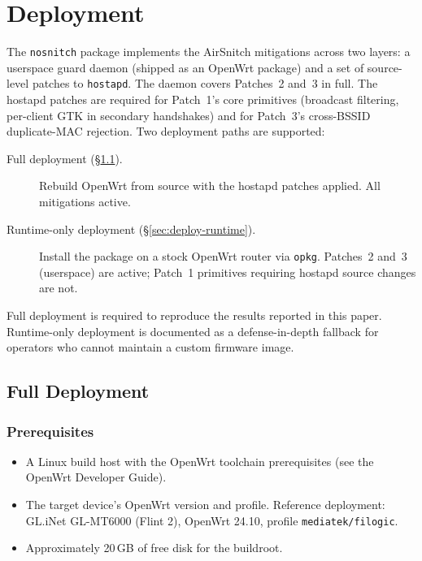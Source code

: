 
\section{Deployment}
\label{sec:deployment}

The \texttt{nosnitch} package implements the AirSnitch mitigations across
two layers: a userspace guard daemon (shipped as an OpenWrt package) and
a set of source-level patches to \texttt{hostapd}. The daemon covers
Patches~2 and~3 in full. The hostapd patches are required for Patch~1's
core primitives (broadcast filtering, per-client GTK in secondary
handshakes) and for Patch~3's cross-BSSID duplicate-MAC rejection. Two
deployment paths are supported:

\begin{description}
  \item[Full deployment (\S\ref{sec:deploy-full}).] Rebuild OpenWrt from
  source with the hostapd patches applied. All mitigations active.
  \item[Runtime-only deployment (\S\ref{sec:deploy-runtime}).] Install
  the package on a stock OpenWrt router via \texttt{opkg}. Patches~2
  and~3 (userspace) are active; Patch~1 primitives requiring hostapd
  source changes are not.
\end{description}

Full deployment is required to reproduce the results reported in this
paper. Runtime-only deployment is documented as a defense-in-depth
fallback for operators who cannot maintain a custom firmware image.

\subsection{Full Deployment}
\label{sec:deploy-full}

\subsubsection{Prerequisites}

\begin{itemize}
  \item A Linux build host with the OpenWrt toolchain prerequisites
  (see the OpenWrt Developer Guide).
  \item The target device's OpenWrt version and profile. Reference
  deployment: GL.iNet GL-MT6000 (Flint 2), OpenWrt 24.10,
  profile \texttt{mediatek/filogic}.
  \item Approximately 20\,GB of free disk for the buildroot.
\end{itemize}


